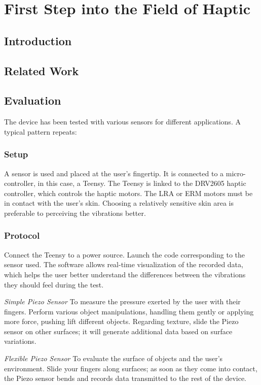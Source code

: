 \chapter{First Step into the Field of Haptic}
\section{Introduction}

\section{Related Work}

\section{Evaluation}
The device has been tested with various sensors for different applications. A typical pattern repeats: 

\subsection{Setup}
A sensor is used and placed at the user's fingertip. It is connected to a micro-controller, in this case, a Teensy. The Teensy is linked to the DRV2605 haptic controller, which controls the haptic motors. The LRA or ERM motors must be in contact with the user's skin. Choosing a relatively sensitive skin area is preferable to perceiving the vibrations better.

\subsection{Protocol}
Connect the Teensy to a power source. Launch the code corresponding to the sensor used. The software allows real-time visualization of the recorded data, which helps the user better understand the differences between the vibrations they should feel during the test.

\textit{Simple Piezo Sensor}
To measure the pressure exerted by the user with their fingers. Perform various object manipulations, handling them gently or applying more force, pushing lift different objects. Regarding texture, slide the Piezo sensor on other surfaces; it will generate additional data based on surface variations.

\textit{Flexible Piezo Sensor}
To evaluate the surface of objects and the user's environment. Slide your fingers along surfaces; as soon as they come into contact, the Piezo sensor bends and records data transmitted to the rest of the device.

